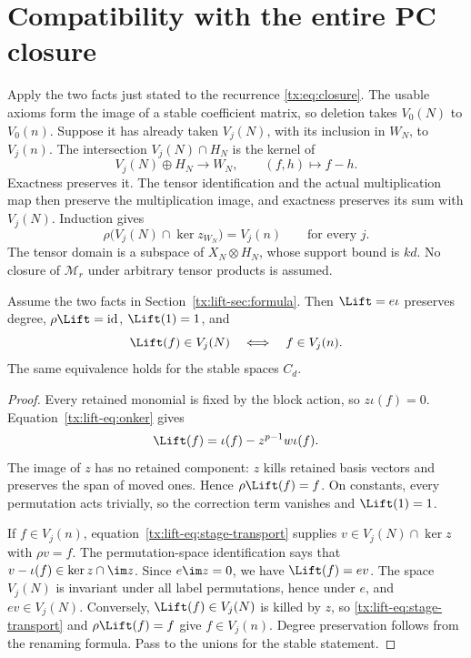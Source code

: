 \section{Compatibility with the entire PC closure}\label{tx:lift-sec:verify}
Apply the two facts just stated to the recurrence
\eqref{tx:eq:closure}. The usable axioms form the image of a stable
coefficient matrix, so deletion takes $V_0(N)$ to $V_0(n)$. Suppose
it has already taken $V_j(N)$, with its inclusion in $W_N$, to $V_j(n)$.
The intersection $V_j(N)\cap H_N$ is the kernel of
\[
              V_j(N)\oplus H_N\longrightarrow W_N,
              \qquad (f,h)\longmapsto f-h.
\]
Exactness preserves it. The tensor identification and the actual
multiplication map then preserve the multiplication image, and exactness
preserves its sum with $V_j(N)$. Induction gives
\begin{equation}\label{tx:lift-eq:stage-transport}
       \rho\bigl(V_j(N)\cap\ker z_{W_N}\bigr)=V_j(n)
                         \qquad\text{for every }j.
\end{equation}
The tensor domain is a subspace of $X_N\otimes H_N$, whose support bound
is $kd$. No closure of $\mathcal M_r$ under arbitrary tensor products
is assumed.

\begin{proposition}\label{tx:lift-prop:lift}
Assume the two facts in Section~\ref{tx:lift-sec:formula}. Then
$\Lift=e\iota$ preserves degree, $\rho\Lift=\mathrm{id}$,
$\Lift(1)=1$, and
\[
                  \Lift(f)\in V_j(N)\quad\Longleftrightarrow\quad
                  f\in V_j(n).
\]
The same equivalence holds for the stable spaces $C_d$.
\end{proposition}
\begin{proof}
Every retained monomial is fixed by the block action, so $z\iota(f)=0$.
Equation~\eqref{tx:lift-eq:onker} gives
\[
                  \Lift(f)=\iota(f)-z^{p-1}w\iota(f).
\]
The image of $z$ has no retained component: $z$ kills retained basis
vectors and preserves the span of moved ones. Hence $\rho\Lift(f)=f$.
On constants, every permutation acts trivially, so the correction term
vanishes and $\Lift(1)=1$.

If $f\in V_j(n)$, equation~\eqref{tx:lift-eq:stage-transport} supplies
$v\in V_j(N)\cap\ker z$ with $\rho v=f$. The permutation-space
identification says that $v-\iota(f)\in\ker z\cap\im z$. Since
$e\im z=0$, we have $\Lift(f)=ev$. The space $V_j(N)$ is invariant
under all label permutations, hence under $e$, and $ev\in V_j(N)$.
Conversely, $\Lift(f)\in V_j(N)$ is killed by $z$, so
\eqref{tx:lift-eq:stage-transport} and $\rho\Lift(f)=f$ give $f\in V_j(n)$.
Degree preservation follows from the renaming formula. Pass to the
unions for the stable statement.
\end{proof}

